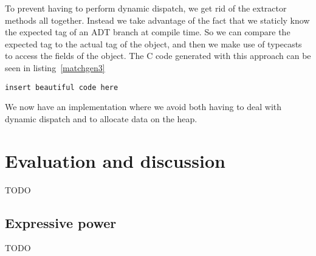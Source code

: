 \documentclass[10pt]{report}
\begin{document}
\par{To prevent having to perform dynamic dispatch, we get rid of the extractor methods all together. Instead we take advantage of the fact that we staticly know the expected tag of an ADT branch at compile time. So we can compare the expected tag to the actual tag of the object, and then we make use of typecasts to access the fields of the object. The C code generated with this approach can be seen in listing~\ref{matchgen3}}

\begin{lstlisting}[language=encore,caption={Pattern matching on a List},label=matchgen3]
  insert beautiful code here
\end{lstlisting}
\par{We now have an implementation where we avoid both having to deal with dynamic dispatch and to allocate data on the heap.}
\chapter{Evaluation and discussion}
TODO
\section{Expressive power}
TODO
\end{document}
